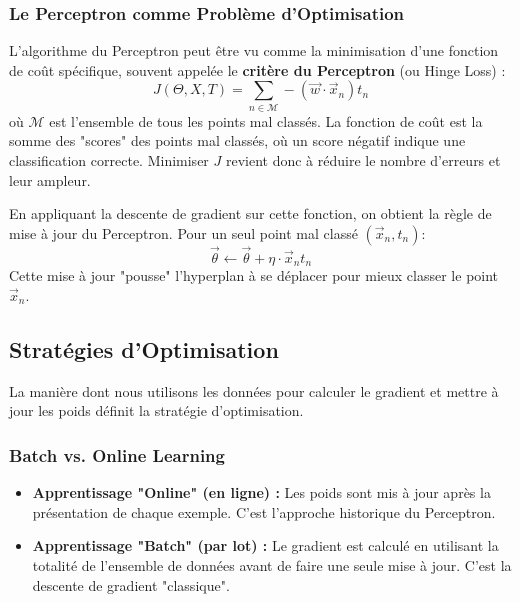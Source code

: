 \documentclass[12pt]{article}
\begin{document}
\subsubsection{Le Perceptron comme Problème d'Optimisation}
L'algorithme du Perceptron peut être vu comme la minimisation d'une fonction de coût spécifique, souvent appelée le \textbf{critère du Perceptron} (ou Hinge Loss) :
\begin{equation}
J(\Theta, X, T) = \sum_{n \in \mathcal{M}} -(\vec{w} \cdot \vec{x}_n)t_n
\end{equation}
où $\mathcal{M}$ est l'ensemble de tous les points mal classés. La fonction de coût est la somme des "scores" des points mal classés, où un score négatif indique une classification correcte. Minimiser $J$ revient donc à réduire le nombre d'erreurs et leur ampleur.

En appliquant la descente de gradient sur cette fonction, on obtient la règle de mise à jour du Perceptron. Pour un seul point mal classé $(\vec{x}_n, t_n)$:
\begin{equation}
\vec{\theta} \leftarrow \vec{\theta} + \eta \cdot \vec{x}_n t_n
\end{equation}
Cette mise à jour "pousse" l'hyperplan à se déplacer pour mieux classer le point $\vec{x}_n$.

\subsection{Stratégies d'Optimisation}
La manière dont nous utilisons les données pour calculer le gradient et mettre à jour les poids définit la stratégie d'optimisation.

\subsubsection{Batch vs. Online Learning}
\begin{itemize}
    \item \textbf{Apprentissage "Online" (en ligne) :} Les poids sont mis à jour après la présentation de chaque exemple. C'est l'approche historique du Perceptron.
    \item \textbf{Apprentissage "Batch" (par lot) :} Le gradient est calculé en utilisant la totalité de l'ensemble de données avant de faire une seule mise à jour. C'est la descente de gradient "classique".
\end{itemize}
\end{document}
